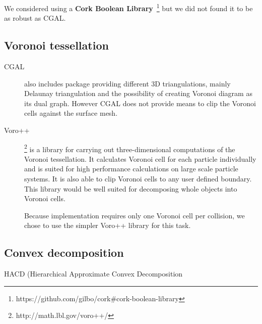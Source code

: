 We considered using a \textbf{Cork Boolean Library}~\footnote{https://github.com/gilbo/cork\#cork-boolean-library} but we did not found it to be as robust as CGAL.

\subsection{Voronoi tessellation}
\begin{description}

\item[CGAL] also includes package providing different 3D triangulations, mainly Delaunay triangulation and the possibility of creating Voronoi diagram as its dual graph. However CGAL does not provide means to clip the Voronoi cells against the surface mesh.

\item[Voro++]\footnote{http://math.lbl.gov/voro++/} is a library for carrying out three-dimensional computations of the Voronoi tessellation. It calculates Voronoi cell for each particle individually and is suited for high performance calculations on large scale particle systems. It is also able to clip Voronoi cells to any user defined boundary. This library would be well suited for decomposing whole objects into Voronoi cells. 

Because implementation requires only one Voronoi cell per collision, we chose to use the simpler Voro++ library for this task. 
\end{description}


\subsection{Convex decomposition}
\label{sec:decompositionLib}
HACD (Hierarchical Approximate Convex Decomposition
\cite{HACD}






